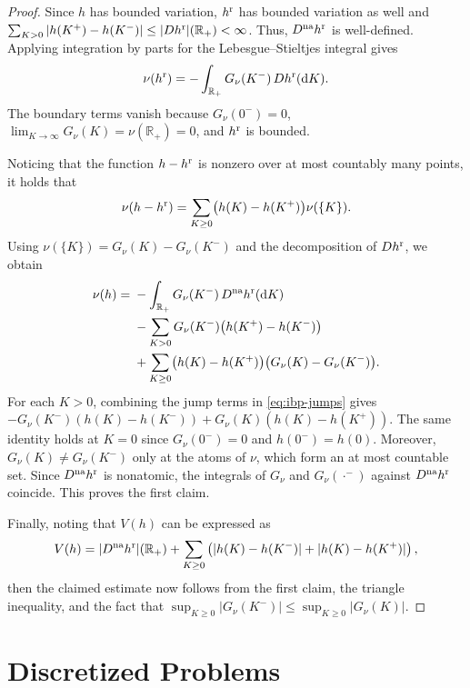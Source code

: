\documentclass[11pt]{article}
\newcommand{\R}{\mathbb{R}} %
\theoremstyle{plain}
\theoremstyle{definition}
\theoremstyle{remark}
\newcommand*{\rd}{\mathrm{d}}
\theoremstyle{plain}
\begin{document}
\begin{proof}
Since $h$ has bounded variation, $h^{\rm r}$ has bounded variation as well and
$\sum_{K>0}|h(K^+)-h(K^-)|\le |Dh^{\rm r}|(\R_+)<\infty$.
Thus, $D^{\rm na}h^{\rm r}$ is well-defined. Applying integration by parts for the Lebesgue--Stieltjes integral gives
\[
\nu(h^{\rm r})
=-\int_{\R_+}G_\nu(K^-)\,Dh^{\rm r}(\rd K).
\]
The boundary terms vanish because $G_\nu(0^-)=0$, $\lim_{K\to\infty}G_\nu(K)=\nu(\R_+)=0$, and $h^{\rm r}$ is bounded.

Noticing that the function $h-h^{\rm r}$ is nonzero over at most countably many points, it holds that
\[
\nu(h-h^{\rm r})
=\sum_{K\ge0}\bigl(h(K)-h(K^+)\bigr)\nu(\{K\}).
\]
Using $\nu(\{K\})=G_\nu(K)-G_\nu(K^-)$ and the decomposition of $Dh^{\rm r}$, we obtain
\begin{equation}\label{eq:ibp-jumps}
\begin{aligned}
\nu(h)
={}&-\int_{\R_+}G_\nu(K^-)\,D^{\rm na}h^{\rm r}(\rd K)\\
&-\sum_{K>0}G_\nu(K^-)\bigl(h(K^+)-h(K^-)\bigr)\\
&+\sum_{K\ge0}\bigl(h(K)-h(K^+)\bigr)
\bigl(G_\nu(K)-G_\nu(K^-)\bigr).
\end{aligned}
\end{equation}
For each $K>0$, combining the jump terms in \eqref{eq:ibp-jumps} gives
$-G_\nu(K^-)(h(K)-h(K^-))+G_\nu(K)(h(K)-h(K^+))$. The same identity holds at $K=0$ since $G_\nu(0^-)=0$ and $h(0^-)=h(0)$. Moreover, $G_\nu(K)\ne G_\nu(K^-)$ only at the atoms of $\nu$, which form an at most countable set. Since $D^{\rm na}h^{\rm r}$ is nonatomic, the integrals of $G_\nu$ and $G_\nu(\cdot^-)$ against $D^{\rm na}h^{\rm r}$ coincide. This proves the first claim.

Finally, noting that $V(h)$ can be expressed as
\[
V(h)
=
|D^{\rm na}h^{\rm r}|(\R_+)
+\sum_{K\ge0}\left(
|h(K)-h(K^-)|+|h(K)-h(K^+)|
\right),
\]
then the claimed estimate now follows from the first claim, the triangle inequality, and the fact that $\sup_{K\ge0}|G_\nu(K^-)| \leq \sup_{K\ge0}|G_\nu(K)|$.
\end{proof}


\section{Discretized Problems} \label{app:LP}
\end{document}
